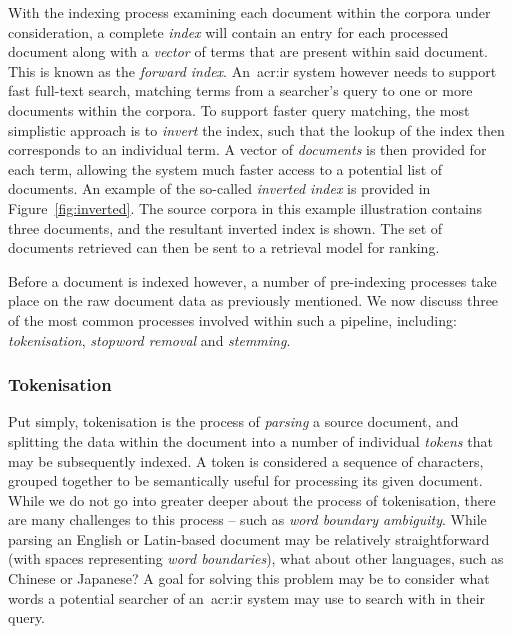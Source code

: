 With the indexing process examining each document within the corpora under consideration, a complete \emph{index} will contain an entry for each processed document along with a \emph{vector} of terms that are present within said document. This is known as the \emph{forward index}. An~\gls{acr:ir} system however needs to support fast full-text search, matching terms from a searcher's query to one or more documents within the corpora. To support faster query matching, the most simplistic approach is to \emph{invert} the index, such that the lookup of the index then corresponds to an individual term. A vector of \emph{documents} is then provided for each term, allowing the system much faster access to a potential list of documents. An example of the so-called \emph{inverted index} is provided in Figure~\ref{fig:inverted}. The source corpora in this example illustration contains three documents, and the resultant inverted index is shown. The set of documents retrieved can then be sent to a retrieval model for ranking.

Before a document is indexed however, a number of pre-indexing processes take place on the raw document data as previously mentioned. We now discuss three of the most common processes involved within such a pipeline, including: \emph{tokenisation}, \emph{stopword removal} and \emph{stemming}.

\subsubsection{Tokenisation}
Put simply, tokenisation is the process of \emph{parsing} a source document, and splitting the data within the document into a number of individual \emph{tokens} that may be subsequently indexed. A token is considered a sequence of characters, grouped together to be semantically useful for processing its given document. While we do not go into greater deeper about the process of tokenisation, there are many challenges to this process -- such as \emph{word boundary ambiguity}. While parsing an English or Latin-based document may be relatively straightforward (with spaces representing \emph{word boundaries}), what about other languages, such as Chinese or Japanese? A goal for solving this problem may be to consider what words a potential searcher of an~\gls{acr:ir} system may use to search with in their query.

